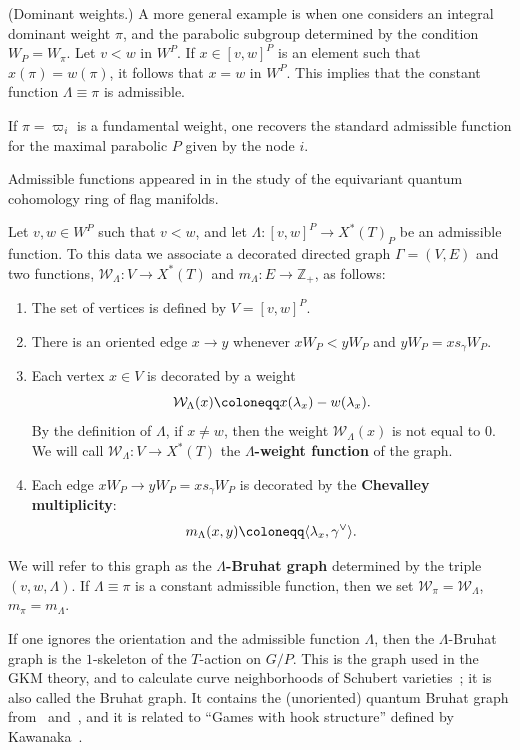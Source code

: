 \begin{example}	
	(Dominant weights.) A more general example is when 
	one considers an integral dominant weight $\pi$, and the 
	parabolic subgroup determined by the condition $W_P = W_\pi$. 
	Let $v < w$ in $W^P$. If $x \in [v,w]^P$ is an element such that 
	$x(\pi) = w(\pi)$, it follows that $x=w$ in $W^P$. This implies that the constant function 
	$\Lambda \equiv \pi$ is admissible. 		
	
	If $\pi= \varpi_i$ is a fundamental weight, one recovers the standard admissible function for the maximal parabolic $P$ given by the node $i$.
\end{example}
Admissible functions appeared in 
\cite[\S 7]{mihalcea:eqqhom} in the study of the equivariant quantum 
cohomology ring of flag manifolds.

\begin{defin}\label{def:ref_di} Let $v,w \in W^P$ such that $v <w$, and let \mbox{$\Lambda: [v,w]^P \to X^*(T)_P$} be an admissible function. 
To this data we associate a decorated directed graph $\Gamma=(V,E)$ and two functions, 
$\mathcal{W}_\Lambda: V \to {X^*(T)}$
and $m_\Lambda: E \to \mathbb{Z}_+$, 
as follows:
\begin{enumerate} \item The set of vertices is defined by $V=[v,w]^P$.
\item There is an oriented edge $x{\to} y$ whenever 
$xW_P < yW_P$ and
$yW_P=x s_\gamma W_P$.
\item Each vertex $x \in V$ is decorated by a weight
\[ \mathcal{W}_\Lambda(x) \coloneqq  x(\lambda_x) - w(\lambda_x) \/. \]  
By the definition of $\Lambda$, if $x \neq w$, then the weight $\mathcal{W}_\Lambda(x)$ is not equal to $0$.
We will call $\mathcal{W}_\Lambda: V \to X^*(T)$ the 
{\bf $\Lambda$-weight function} of the graph.
\item Each edge $xW_P {\to} y W_P=x s_\gamma W_P$ is decorated by the 
{\bf Chevalley multiplicity}: 
\[ m_\Lambda(x,y) \coloneqq  \langle \lambda_x, \gamma^\vee \rangle \/. \]
\end{enumerate}
We will refer to this graph as the {\bf $\Lambda$-Bruhat graph} determined by the triple $(v,w,\Lambda)$.
If $\Lambda \equiv \pi$ is a constant admissible function, then we set 
$\mathcal{W}_\pi = \mathcal{W}_\Lambda$, $m_\pi = m_\Lambda$.  
\end{defin}
If one ignores the orientation and the admissible function $\Lambda$, then the $\Lambda$-Bruhat graph is the 
$1$-skeleton of the $T$-action on $G/P$. This is the graph used in the GKM theory, and to calculate curve neighborhoods of 
Schubert varieties~\cite{buch.m:nbhds}; it is also called the Bruhat graph. 
It contains the (unoriented) quantum 
Bruhat graph from~\cite{BFP99} and~\cite{LNSSS}, and it is related to 
``Games with hook structure'' defined by Kawanaka~\cite{Kaw15}.

